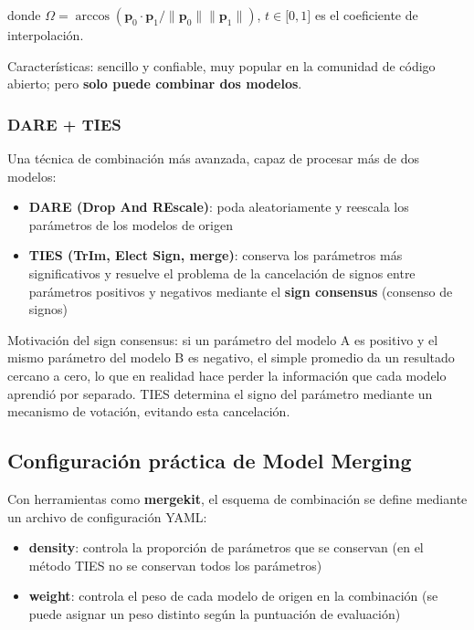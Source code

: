 \documentclass[a4paper]{article}
\begin{document}
donde $\Omega = \arccos(\mathbf{p}_0 \cdot \mathbf{p}_1 / \|\mathbf{p}_0\| \|\mathbf{p}_1\|)$, $t \in {[}0, 1{]}$ es el coeficiente de interpolación.

Características: sencillo y confiable, muy popular en la comunidad de código abierto; pero \textbf{solo puede combinar dos modelos}.

\subsubsection{DARE + TIES}

Una técnica de combinación más avanzada, capaz de procesar más de dos modelos:

\begin{itemize}
    \item \textbf{DARE (Drop And REscale)}: poda aleatoriamente y reescala los parámetros de los modelos de origen
    \item \textbf{TIES (TrIm, Elect Sign, merge)}: conserva los parámetros más significativos y resuelve el problema de la cancelación de signos entre parámetros positivos y negativos mediante el \textbf{sign consensus} (consenso de signos)
\end{itemize}

Motivación del sign consensus: si un parámetro del modelo A es positivo y el mismo parámetro del modelo B es negativo, el simple promedio da un resultado cercano a cero, lo que en realidad hace perder la información que cada modelo aprendió por separado. TIES determina el signo del parámetro mediante un mecanismo de votación, evitando esta cancelación.

\subsection{Configuración práctica de Model Merging}

Con herramientas como \textbf{mergekit}, el esquema de combinación se define mediante un archivo de configuración YAML:

\begin{itemize}
    \item \textbf{density}: controla la proporción de parámetros que se conservan (en el método TIES no se conservan todos los parámetros)
    \item \textbf{weight}: controla el peso de cada modelo de origen en la combinación (se puede asignar un peso distinto según la puntuación de evaluación)
\end{itemize}
\end{document}
